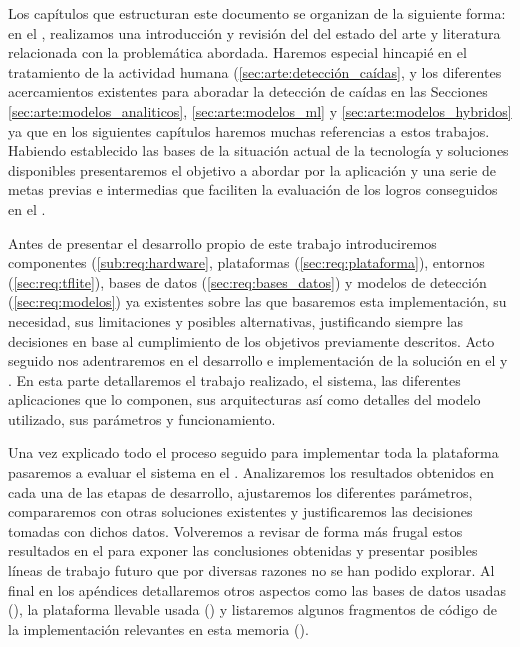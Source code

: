 Los capítulos que estructuran este documento se organizan de la siguiente forma: en el , realizamos una introducción y revisión del del estado del arte y literatura relacionada con la problemática abordada. Haremos especial hincapié en el tratamiento de la actividad humana (\autoref{sec:arte:detección_caídas}, y los diferentes acercamientos existentes para aboradar la detección de caídas en las Secciones \ref{sec:arte:modelos_analiticos}, \ref{sec:arte:modelos_ml} y \ref{sec:arte:modelos_hybridos} ya que en los siguientes capítulos haremos muchas referencias a estos trabajos. Habiendo establecido las bases de la situación actual de la tecnología y soluciones disponibles presentaremos el objetivo a abordar por la aplicación y una serie de metas previas e intermedias que faciliten la evaluación de los logros conseguidos en el .

Antes de presentar el desarrollo propio de este trabajo introduciremos componentes (\ref{sub:req:hardware}, plataformas (\ref{sec:req:plataforma}), entornos (\ref{sec:req:tflite}), bases de datos (\ref{sec:req:bases_datos}) y modelos de detección (\ref{sec:req:modelos}) ya existentes sobre las que basaremos esta implementación, su necesidad, sus limitaciones y posibles alternativas, justificando siempre las decisiones en base al cumplimiento de los objetivos previamente descritos. Acto seguido nos adentraremos en el desarrollo e implementación de la solución en el  y . En esta parte detallaremos el trabajo realizado, el sistema, las diferentes aplicaciones que lo componen, sus arquitecturas así como detalles del modelo utilizado, sus parámetros y funcionamiento.

Una vez explicado todo el proceso seguido para implementar toda la plataforma pasaremos a evaluar el sistema en el . Analizaremos los resultados obtenidos en cada una de las etapas de desarrollo, ajustaremos los diferentes parámetros, compararemos con otras soluciones existentes y justificaremos las decisiones tomadas con dichos datos. Volveremos a revisar de forma más frugal estos resultados en el  para exponer las conclusiones obtenidas y presentar posibles líneas de trabajo futuro que por diversas razones no se han podido explorar. Al final en los apéndices detallaremos otros aspectos como las bases de datos usadas (), la plataforma llevable usada () y listaremos algunos fragmentos de código de la implementación relevantes en esta memoria ().

